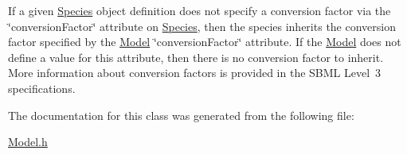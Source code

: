 If a given \hyperlink{class_species}{Species} object definition does not specify a conversion factor via the \char`\"{}conversion\+Factor\char`\"{} attribute on \hyperlink{class_species}{Species}, then the species inherits the conversion factor specified by the \hyperlink{class_model}{Model} \char`\"{}conversion\+Factor\char`\"{} attribute. If the \hyperlink{class_model}{Model} does not define a value for this attribute, then there is no conversion factor to inherit. More information about conversion factors is provided in the S\+B\+ML Level~3 specifications. 

The documentation for this class was generated from the following file\+:\begin{DoxyCompactItemize}
\item 
\hyperlink{_model_8h}{Model.\+h}\end{DoxyCompactItemize}
